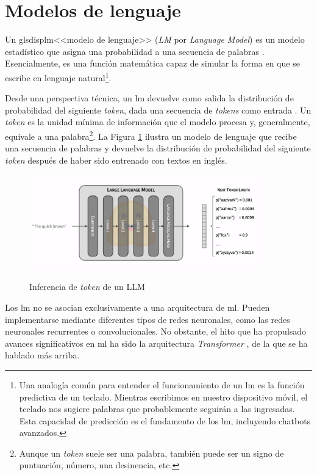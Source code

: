 \section{Modelos de lenguaje}

Un glsdisp{lm}{<<modelo de lenguaje>> (\textit{LM} por \textit{Language Model})} es un modelo estadístico que asigna una probabilidad a una secuencia de palabras \cite{ModelacionLenguaje2024}. Esencialmente, es una función matemática capaz de simular la forma en que se escribe en lenguaje natural\footnote{Una analogía común para entender el funcionamiento de un \gls{lm} es la función predictiva de un teclado. Mientras escribimos en nuestro dispositivo móvil, el teclado nos sugiere palabras que probablemente seguirán a las ingresadas. Esta capacidad de predicción es el fundamento de los \gls{lm}, incluyendo chatbots avanzados.}.

Desde una perspectiva técnica, un \gls{lm} devuelve como salida la distribución de probabilidad del siguiente \textit{token}, dada una secuencia de \textit{tokens} como entrada \citep{GenerationLLMs}. Un \textit{token} es la unidad mínima de información que el modelo procesa y, generalmente, equivale a una palabra\footnote{Aunque un \textit{token} suele ser una palabra, también puede ser un signo de puntuación, número, una desinencia, etc.}. La Figura \ref{fig:llm_generation}
 ilustra un modelo de lenguaje que recibe una secuencia de palabras y devuelve la distribución de probabilidad del siguiente \textit{token} después de haber sido entrenado con textos en inglés.

\begin{figure}[H]
    \caption[Inferencia de \textit{token} de un LLM]{Inferencia de \textit{token} de un LLM}
    \centering
    \includegraphics[width=0.9\textwidth]{./figuras/LLM_predice_token.png}
    \label{fig:llm_generation}
\end{figure}

Los \gls{lm} no se asocian exclusivamente a una arquitectura de \gls{ml}. Pueden implementarse mediante diferentes tipos de redes neuronales, como las redes neuronales recurrentes o convolucionales. No obstante, el hito que ha propulsado avances significativos en \gls{ml} ha sido la arquitectura \textit{Transformer} \citep{vaswaniAttentionAllYou2017}, de la que se ha hablado más arriba.

